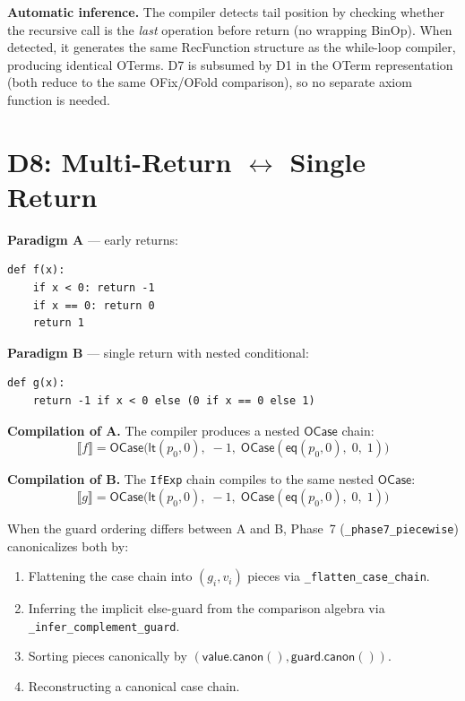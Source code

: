 \documentclass[11pt,a4paper]{report}
\theoremstyle{definition}
\theoremstyle{plain}
\newcommand{\den}[1]{\llbracket #1 \rrbracket}
\begin{document}
\textbf{Automatic inference.}
The compiler detects tail position by checking whether the recursive
call is the \emph{last} operation before return (no wrapping BinOp).
When detected, it generates the same RecFunction structure as the
while-loop compiler, producing identical OTerms.
D7 is subsumed by D1 in the OTerm representation (both reduce to
the same OFix/OFold comparison), so no separate axiom function is
needed.


\section{D8: Multi-Return $\leftrightarrow$ Single Return}
\label{sec:d8}

\textbf{Paradigm A} --- early returns:
\begin{lstlisting}
def f(x):
    if x < 0: return -1
    if x == 0: return 0
    return 1
\end{lstlisting}

\textbf{Paradigm B} --- single return with nested conditional:
\begin{lstlisting}
def g(x):
    return -1 if x < 0 else (0 if x == 0 else 1)
\end{lstlisting}

\textbf{Compilation of A.}
The compiler produces a nested $\mathsf{OCase}$ chain:
\[
  \den{f} = \mathsf{OCase}\!\big(\mathsf{lt}(p_0, 0),\; -1,\;
    \mathsf{OCase}(\mathsf{eq}(p_0, 0),\; 0,\; 1)\big)
\]

\textbf{Compilation of B.}
The \texttt{IfExp} chain compiles to the same nested
$\mathsf{OCase}$:
\[
  \den{g} = \mathsf{OCase}\!\big(\mathsf{lt}(p_0, 0),\; -1,\;
    \mathsf{OCase}(\mathsf{eq}(p_0, 0),\; 0,\; 1)\big)
\]

When the guard ordering differs between A and B, Phase~7
(\texttt{\_phase7\_piecewise}) canonicalizes both by:
\begin{enumerate}
  \item Flattening the case chain into $(g_i, v_i)$ pieces
    via \texttt{\_flatten\_case\_chain}.
  \item Inferring the implicit else-guard from the comparison algebra
    via \texttt{\_infer\_complement\_guard}.
  \item Sorting pieces canonically by $(\mathsf{value.canon()},
    \mathsf{guard.canon()})$.
  \item Reconstructing a canonical case chain.
\end{enumerate}
\end{document}
